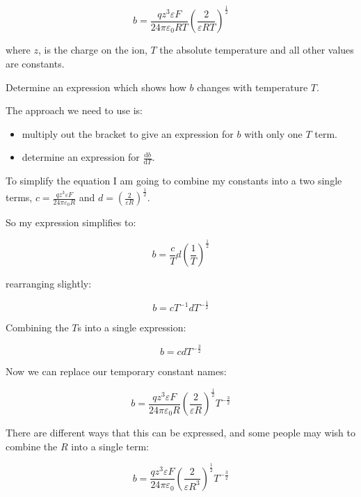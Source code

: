\documentclass[
]{book}
\begin{document}
\begin{equation*}
b=\frac{qz^3 \varepsilon F}{24 \pi \varepsilon_0 RT} \left( \frac{2}{ \varepsilon RT} \right)^\frac{1}{2}
\end{equation*}

where \(z\), is the charge on the ion, \(T\) the absolute temperature and all other values are constants.

Determine an expression which shows how \(b\) changes with temperature \(T\).

The approach we need to use is:

\begin{itemize}
\item
  multiply out the bracket to give an expression for \(b\) with only one \(T\) term.
\item
  determine an expression for \(\tfrac{\textrm{d}b}{\textrm{d}T}\).
\end{itemize}

To simplify the equation I am going to combine my constants into a two single terms, \(c = \frac{qz^3\varepsilon F}{24 \pi \varepsilon_0 R}\) and \(d= \left( \frac{2}{ \varepsilon R} \right)^\frac{1}{2}\).

So my expression simplifies to:

\begin{equation*}
b=\frac{c}{T} d\left( \frac{1}{T} \right)^\frac{1}{2}
\end{equation*}

rearranging slightly:

\begin{equation*}
b=cT^{-1}dT^{-\frac{1}{2}}
\end{equation*}

Combining the \(T\)s into a single expression:

\begin{equation*}
b=cdT^{-\frac{3}{2}}
\end{equation*}

Now we can replace our temporary constant names:

\begin{equation*}
b=\frac{qz^3\varepsilon F}{24 \pi \varepsilon_0 R}\left( \frac{2}{ \varepsilon R} \right)^\frac{1}{2}T^{-\frac{3}{2}}
\end{equation*}

There are different ways that this can be expressed, and some people may wish to combine the \(R\) into a single term:

\begin{equation*}
b=\frac{qz^3\varepsilon F}{24 \pi \varepsilon_0}\left( \frac{2}{ \varepsilon R^3} \right)^\frac{1}{2}T^{-\frac{3}{2}}
\end{equation*}
\end{document}
